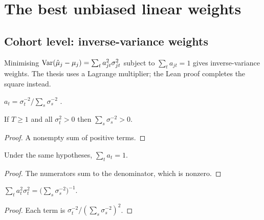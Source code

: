 \chapter{The best unbiased linear weights}\label{ch:weights}

\section{Cohort level: inverse-variance weights}

Minimising $\operatorname{Var}(\hat\mu_j - \mu_j) = \sum_t a_{jt}^2\sigma_{jt}^2$ subject to
$\sum_t a_{jt} = 1$ gives inverse-variance weights. The thesis uses a
Lagrange multiplier; the Lean proof completes the square instead.

\begin{definition}\label{def:invVarWeight}
  \leanok
  $a_t = \sigma_t^{-2} / \sum_s \sigma_s^{-2}$ .
\end{definition}

\begin{lemma}\label{lem:sum_inv_pos}
  \leanok
  If $T \ge 1$ and all $\sigma_t^2 > 0$ then $\sum_s \sigma_s^{-2} > 0$.
\end{lemma}
\begin{proof}
  \leanok
  A nonempty sum of positive terms.
\end{proof}

\begin{lemma}\label{lem:sum_invVarWeight}
  \leanok
  Under the same hypotheses, $\sum_t a_t = 1$.
\end{lemma}
\begin{proof}
  \leanok
  The numerators sum to the denominator, which is nonzero.
\end{proof}

\begin{lemma}\label{lem:invVarWeight_value}
  \leanok
  $\sum_t a_t^2\sigma_t^2 = \bigl(\sum_s \sigma_s^{-2}\bigr)^{-1}$.
\end{lemma}
\begin{proof}
  \leanok
  Each term is $\sigma_t^{-2} / (\sum_s \sigma_s^{-2})^2$.
\end{proof}

